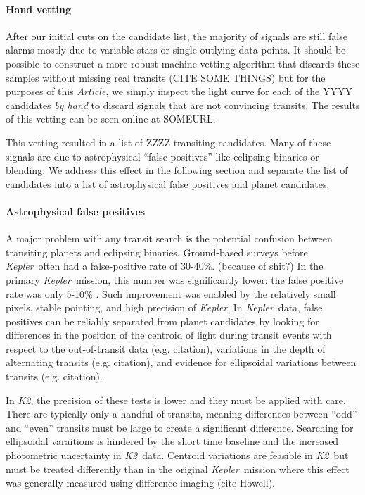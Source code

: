 \documentclass[12pt,preprint]{aastex}
\newcommand{\project}[1]{\textsl{#1}} %
\newcommand{\kepler}{\project{Kepler}}
\newcommand{\KT}{\project{K2}}
\newcommand{\paper}{\textsl{Article}}
\begin{document}
\paragraph{Hand vetting}

After our initial cuts on the candidate list, the majority of signals are
still false alarms mostly due to variable stars or single outlying data
points.
It should be possible to construct a more robust machine vetting algorithm
that discards these samples without missing real transits (CITE SOME THINGS)
but for the purposes of this \paper, we simply inspect the light curve for
each of the YYYY candidates \emph{by hand} to discard signals that are not
convincing transits.
The results of this vetting can be seen online at SOMEURL.

This vetting resulted in a list of ZZZZ transiting candidates.
Many of these signals are due to astrophysical ``false positives'' like
eclipsing binaries or blending.
We address this effect in the following section and separate the list of
candidates into a list of astrophysical false positives and planet candidates.


\paragraph{Astrophysical false positives}

A major problem with any transit search is the potential confusion between
transiting planets and eclipsing binaries.
Ground-based surveys before \kepler\ often had a false-positive rate
of 30-40\%. (because of shit?)
In the primary \kepler\ mission, this number was significantly lower:
the false positive rate was only 5-10\% \citep{Morton:2011}.
Such improvement was enabled by the relatively small pixels, stable
pointing, and high precision of \kepler.
In \kepler\ data, false positives can be reliably separated from
planet candidates by looking for differences in the position of the
centroid of light during transit events with respect to the
out-of-transit data (e.g. citation), variations in the depth of
alternating transits (e.g. citation), and evidence for ellipsoidal
variations between transits (e.g. citation).

In \KT, the precision of these tests is lower and they must be applied with
care.
There are typically only a handful of transits, meaning differences between
``odd'' and ``even'' transits must be large to create a significant
difference.
Searching for ellipsoidal varaitions is hindered by the short time baseline
and the increased photometric uncertainty in \KT\ data.
Centroid variations are feasible in \KT\ but must be treated differently than
in the original \kepler\ mission where this effect was generally measured
using difference imaging (cite Howell).
\end{document}
